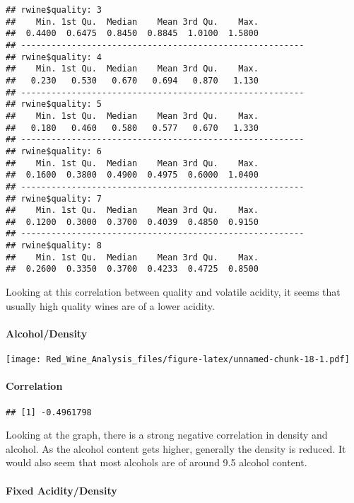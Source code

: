 \documentclass[]{article}
\let\oldparagraph\paragraph
\renewcommand{\paragraph}[1]{\oldparagraph{#1}\mbox{}}
\begin{document}
\begin{verbatim}
## rwine$quality: 3
##    Min. 1st Qu.  Median    Mean 3rd Qu.    Max. 
##  0.4400  0.6475  0.8450  0.8845  1.0100  1.5800 
## -------------------------------------------------------- 
## rwine$quality: 4
##    Min. 1st Qu.  Median    Mean 3rd Qu.    Max. 
##   0.230   0.530   0.670   0.694   0.870   1.130 
## -------------------------------------------------------- 
## rwine$quality: 5
##    Min. 1st Qu.  Median    Mean 3rd Qu.    Max. 
##   0.180   0.460   0.580   0.577   0.670   1.330 
## -------------------------------------------------------- 
## rwine$quality: 6
##    Min. 1st Qu.  Median    Mean 3rd Qu.    Max. 
##  0.1600  0.3800  0.4900  0.4975  0.6000  1.0400 
## -------------------------------------------------------- 
## rwine$quality: 7
##    Min. 1st Qu.  Median    Mean 3rd Qu.    Max. 
##  0.1200  0.3000  0.3700  0.4039  0.4850  0.9150 
## -------------------------------------------------------- 
## rwine$quality: 8
##    Min. 1st Qu.  Median    Mean 3rd Qu.    Max. 
##  0.2600  0.3350  0.3700  0.4233  0.4725  0.8500
\end{verbatim}

Looking at this correlation between quality and volatile acidity, it
seems that usually high quality wines are of a lower acidity.

\hypertarget{alcoholdensity}{%
\paragraph{Alcohol/Density}\label{alcoholdensity}}

\texttt{[image: Red\_Wine\_Analysis\_files/figure-latex/unnamed-chunk-18-1.pdf]}

\hypertarget{correlation}{%
\paragraph{Correlation}\label{correlation}}

\begin{verbatim}
## [1] -0.4961798
\end{verbatim}

Looking at the graph, there is a strong negative correlation in density
and alcohol. As the alcohol content gets higher, generally the density
is reduced. It would also seem that most alcohols are of around 9.5
alcohol content.

\hypertarget{fixed-aciditydensity}{%
\paragraph{Fixed Acidity/Density}\label{fixed-aciditydensity}}
\end{document}
